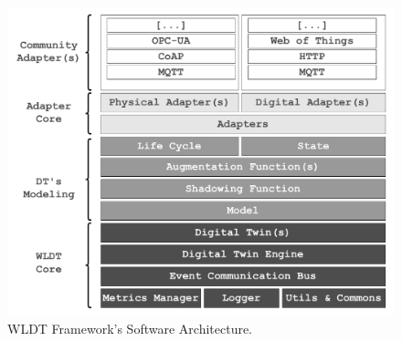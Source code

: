 
\begin{figure}[t]
    \setlength{\belowcaptionskip}{-13pt}
    \centering
    \includegraphics[width=\columnwidth]{figures/engineering-wldt/wldt_architecture.pdf}
    \caption{WLDT Framework's Software Architecture.}
    \label{fig:wldt_architecture}
\end{figure}

